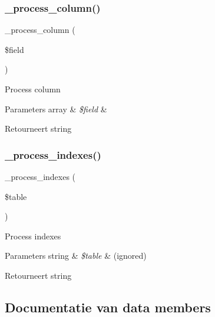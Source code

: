 \subsubsection{\texorpdfstring{\_process\_column()}{\_process\_column()}}
{\footnotesize\ttfamily \+\_\+process\+\_\+column (\begin{DoxyParamCaption}\item[{}]{\$field }\end{DoxyParamCaption})\hspace{0.3cm}{\ttfamily [protected]}}

Process column


\begin{DoxyParams}[1]{Parameters}
array & {\em \$field} & \\
\hline
\end{DoxyParams}
\begin{DoxyReturn}{Retourneert}
string 
\end{DoxyReturn}
\mbox{\label{class_c_i___d_b__pdo__mysql__forge_ae0bdb4ea3418590d1894c5b621b5ca50}} 
\subsubsection{\texorpdfstring{\_process\_indexes()}{\_process\_indexes()}}
{\footnotesize\ttfamily \+\_\+process\+\_\+indexes (\begin{DoxyParamCaption}\item[{}]{\$table }\end{DoxyParamCaption})\hspace{0.3cm}{\ttfamily [protected]}}

Process indexes


\begin{DoxyParams}[1]{Parameters}
string & {\em \$table} & (ignored) \\
\hline
\end{DoxyParams}
\begin{DoxyReturn}{Retourneert}
string 
\end{DoxyReturn}


\subsection{Documentatie van data members}
\mbox{\label{class_c_i___d_b__pdo__mysql__forge_aae977ae6d61fa183f0b25422b6ddc31c}} 

